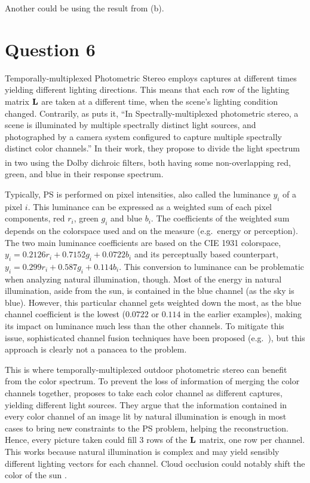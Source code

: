 \documentclass{report}
\begin{document}
Another could be using the result from (b).

\section{Question 6}

Temporally-multiplexed Photometric Stereo employs captures at different times yielding different lighting directions. This means that each row of the lighting matrix $\mathbf{L}$ are taken at a different time, when the scene's lighting condition changed. Contrarily, as \cite{Fyffe2011} puts it, ``In Spectrally-multiplexed photometric stereo, a scene is illuminated by multiple spectrally distinct light sources, and photographed by a camera system configured to capture multiple spectrally distinct color channels.'' In their work, they propose to divide the light spectrum in two using the Dolby\textsuperscript{\textregistered} dichroic filters, both having some non-overlapping red, green, and blue in their response spectrum.

Typically, PS is performed on pixel intensities, also called the luminance $y_i$ of a pixel $i$. This luminance can be expressed as a weighted sum of each pixel components, red $r_i$, green $g_i$ and blue $b_i$. The coefficients of the weighted sum depends on the colorspace used and on the measure (e.g.\ energy or perception). The two main luminance coefficients are based on the CIE 1931 colorspace, $y_i = 0.2126r_i + 0.7152g_i + 0.0722b_i$ and its perceptually based counterpart, $y_i = 0.299r_i + 0.587g_i + 0.114b_i$. This conversion to luminance can be problematic when analyzing natural illumination, though. Most of the energy in natural illumination, aside from the sun, is contained in the blue channel (as the sky is blue). However, this particular channel gets weighted down the most, as the blue channel coefficient is the lowest ($0.0722$ or $0.114$ in the earlier examples), making its impact on luminance much less than the other channels. To mitigate this issue, sophisticated channel fusion techniques have been proposed (e.g.\ \cite{jung-cvpr-15}), but this approach is clearly not a panacea to the problem.

This is where temporally-multiplexed outdoor photometric stereo can benefit from the color spectrum. To prevent the loss of information of merging the color channels together, \cite{johnson-cvpr-11} proposes to take each color channel as different captures, yielding different light sources. They argue that the information contained in every color channel of an image lit by natural illumination is enough in most cases to bring new constraints to the PS problem, helping the reconstruction. Hence, every picture taken could fill 3 rows of the $\mathbf{L}$ matrix, one row per channel. This works because natural illumination is complex and may yield sensibly different lighting vectors for each channel. Cloud occlusion could notably shift the color of the sun .
\end{document}
